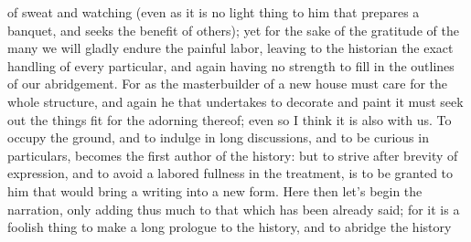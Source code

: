 {{} of sweat and watching
(even as it is no light thing to him that prepares a banquet, and seeks the benefit of others); yet for the sake of the gratitude of the many we will gladly endure the painful labor,
leaving to the historian the exact handling of every particular, and again
 having no strength to
 fill in the outlines of our abridgement.
For as the masterbuilder of a new house must care for the whole
 structure, and again he that undertakes to
 decorate and paint it must seek out the things fit for the adorning thereof; even so I think it is also with us.
To occupy the ground, and to
 indulge in long discussions, and to be curious in particulars, becomes the first author of the history:
but to strive after brevity of expression, and to avoid a labored fullness in the treatment, is to be granted to him that would bring a writing into a new form.
Here then let’s begin the narration, only adding thus much to that which has been already
 said; for it is a foolish thing to make a long prologue to the history, and to abridge the history
{}
\par }{\BB \par }
